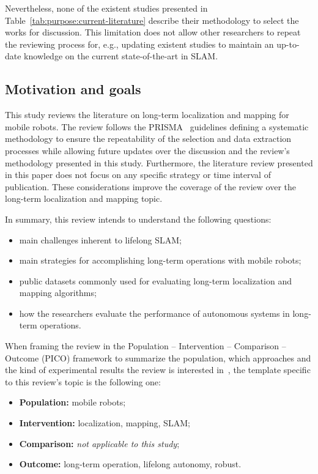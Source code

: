 Nevertheless, none of the existent studies presented in Table~\ref{tab:purpose:current-literature} describe their methodology to select the works for discussion. This limitation does not allow other researchers to repeat the reviewing process for, e.g., updating existent studies to maintain an up-to-date knowledge on the current state-of-the-art in SLAM.





\subsection{Motivation and goals}

This study reviews the literature on long-term localization and mapping for mobile robots. The review follows the PRISMA~\parencite{methodology:prisma} guidelines defining a systematic methodology to ensure the repeatability of the selection and data extraction processes while allowing future updates over the discussion and the review's methodology presented in this study. 
Furthermore, the literature review presented in this paper does not focus on any specific strategy or time interval of publication. These considerations improve the coverage of the review over the long-term localization and mapping topic.

In summary, this review intends to understand the following questions:

\begin{itemize}[nosep]
\item main challenges inherent to lifelong SLAM;
\item main strategies for accomplishing long-term operations with mobile robots;
\item public datasets commonly used for evaluating long-term localization and mapping algorithms;
\item how the researchers evaluate the performance of autonomous systems in long-term operations.
\end{itemize}

When framing the review in the Population -- Intervention -- Comparison -- Outcome (PICO) framework to summarize the population, which approaches and the kind of experimental results the review is interested in~\parencite{purpose:pico}, the template specific to this review's topic is the following one:

\begin{itemize}[nosep]
\item \textbf{Population:} mobile robots;
\item \textbf{Intervention:} localization, mapping, SLAM;
\item \textbf{Comparison:} \textit{not applicable to this study};
\item \textbf{Outcome:} long-term operation, lifelong autonomy, robust.
\end{itemize}
